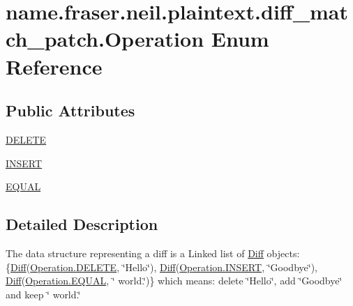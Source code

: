 \hypertarget{enumname_1_1fraser_1_1neil_1_1plaintext_1_1diff__match__patch_1_1Operation}{}\section{name.\+fraser.\+neil.\+plaintext.\+diff\+\_\+match\+\_\+patch.\+Operation Enum Reference}
\label{enumname_1_1fraser_1_1neil_1_1plaintext_1_1diff__match__patch_1_1Operation}
\subsection*{Public Attributes}
\begin{DoxyCompactItemize}
\item 
\hyperlink{enumname_1_1fraser_1_1neil_1_1plaintext_1_1diff__match__patch_1_1Operation_a02c756bfd5e02007c48c08b829a78273}{D\+E\+L\+E\+TE}
\item 
\hyperlink{enumname_1_1fraser_1_1neil_1_1plaintext_1_1diff__match__patch_1_1Operation_aa91d1198290b007669db9e0ca02fa10d}{I\+N\+S\+E\+RT}
\item 
\hyperlink{enumname_1_1fraser_1_1neil_1_1plaintext_1_1diff__match__patch_1_1Operation_a2dbe2e153d9ebe7271d93b037fa0c298}{E\+Q\+U\+AL}
\end{DoxyCompactItemize}


\subsection{Detailed Description}
The data structure representing a diff is a Linked list of \hyperlink{classname_1_1fraser_1_1neil_1_1plaintext_1_1diff__match__patch_1_1Diff}{Diff} objects\+: \{\hyperlink{classname_1_1fraser_1_1neil_1_1plaintext_1_1diff__match__patch_1_1Diff}{Diff}(\hyperlink{enumname_1_1fraser_1_1neil_1_1plaintext_1_1diff__match__patch_1_1Operation_a02c756bfd5e02007c48c08b829a78273}{Operation.\+D\+E\+L\+E\+TE}, \char`\"{}\+Hello\char`\"{}), \hyperlink{classname_1_1fraser_1_1neil_1_1plaintext_1_1diff__match__patch_1_1Diff}{Diff}(\hyperlink{enumname_1_1fraser_1_1neil_1_1plaintext_1_1diff__match__patch_1_1Operation_aa91d1198290b007669db9e0ca02fa10d}{Operation.\+I\+N\+S\+E\+RT}, \char`\"{}\+Goodbye\char`\"{}), \hyperlink{classname_1_1fraser_1_1neil_1_1plaintext_1_1diff__match__patch_1_1Diff}{Diff}(\hyperlink{enumname_1_1fraser_1_1neil_1_1plaintext_1_1diff__match__patch_1_1Operation_a2dbe2e153d9ebe7271d93b037fa0c298}{Operation.\+E\+Q\+U\+AL}, \char`\"{} world.\char`\"{})\} which means\+: delete \char`\"{}\+Hello\char`\"{}, add \char`\"{}\+Goodbye\char`\"{} and keep \char`\"{} world.\char`\"{} 

